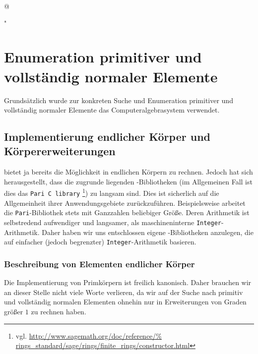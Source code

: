 \lstMakeShortInline[
  basicstyle = \small\normalfont\ttfamily,
  frame = none,
  numberstyle = \tiny,
  breaklines = true,
  escapeinside = {(*}{*)},
  tabsize=3,
  language=C,
  mathescape=true,
  breaklines=true]@

\lstMakeShortInline[
  basicstyle = \small\normalfont\ttfamily,
  frame = none,
  numberstyle = \tiny,
  breaklines = true,
  escapeinside = {(*}{*)},
  tabsize=3,
  language=Python,
  mathescape=true,
  breaklines=true]"


\chapter{Enumeration primitiver und vollständig normaler Elemente}
Grundsätzlich wurde zur konkreten Suche und Enumeration primitiver und
vollständig normaler Elemente das Computeralgebrasystem \sage verwendet.

\section{Implementierung endlicher Körper und Körpererweiterungen}
\sage bietet ja bereits die Möglichkeit in endlichen Körpern zu rechnen. Jedoch
hat sich herausgestellt, dass die zugrunde liegenden \Clang-Bibliotheken 
(im Allgemeinen Fall ist dies das \texttt{Pari C library}%
\footnote{vgl. \url{http://www.sagemath.org/doc/reference/%
rings_standard/sage/rings/finite_rings/constructor.html}}) 
zu langsam sind. Dies ist sicherlich auf die Allgemeinheit ihrer
Anwendungsgebiete zurückzuführen. Beispielsweise arbeitet die 
\texttt{Pari}-Bibliothek stets mit Ganzzahlen beliebiger Größe. Deren
Arithmetik ist selbstredend aufwendiger und langsamer, als maschineninterne
\texttt{Integer}-Arithmetik. Daher haben wir uns entschlossen eigene 
\Clang-Bibliotheken anzulegen, die auf einfacher (jedoch begrenzter) 
\texttt{Integer}-Arithmetik basieren.

\subsection{Beschreibung von Elementen endlicher Körper}
\label{sub:beschreibung_endliche_koerper}
Die Implementierung von Primkörpern ist freilich kanonisch. Daher brauchen wir
an dieser Stelle nicht viele Worte verlieren, da wir auf der Suche nach
primitiv und vollständig normalen Elementen ohnehin nur in Erweiterungen von
Graden größer $1$ zu rechnen haben.

